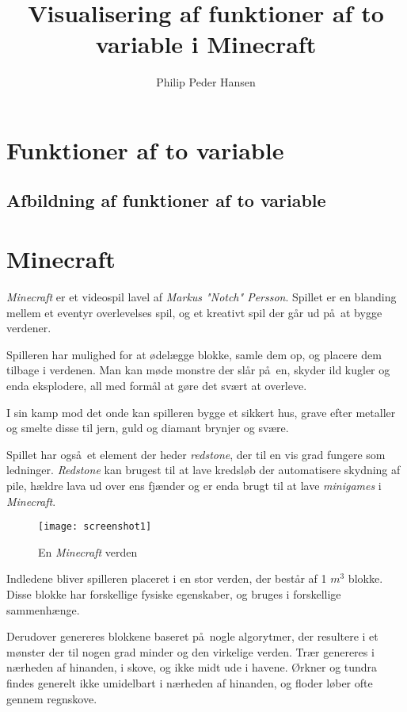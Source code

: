 \documentclass[a4paper,12pt]{report}
\author{Philip Peder Hansen}
\title{Visualisering af funktioner af to variable i Minecraft}
\begin{document}
	\maketitle
	\tableofcontents
	\clearpage
	\section{Funktioner af to variable}
	\subsection{Afbildning af funktioner af to variable}
	\section{Minecraft}
		\emph{Minecraft} er et videospil lavel af \emph{Markus "Notch" Persson}.
		Spillet er en blanding mellem et eventyr overlevelses spil, og et kreativt spil der g\aa r ud p\aa \ at bygge verdener.

		Spilleren har mulighed for at \o del\ae gge blokke, samle dem op, og placere dem tilbage i verdenen.
		Man kan m\o de monstre der sl\aa r p\aa \ en, skyder ild kugler og enda eksplodere, all med form\aa l
		at g\o re det sv\ae rt at overleve.

		I sin kamp mod det onde kan spilleren bygge et sikkert hus, grave efter metaller og smelte disse
		til jern, guld og diamant brynjer og sv\ae re.

		Spillet har ogs\aa \ et element der heder \emph{redstone}, der til en vis grad fungere som ledninger.
		\emph{Redstone} kan brugest til at lave kredsl\o b der automatisere skydning af pile, h\ae ldre lava
		ud over ens fj\ae nder og er enda brugt til at lave \emph{minigames} i \emph{Minecraft}.

		\begin{figure}
			\texttt{[image: screenshot1]}
			\caption{En \emph{Minecraft} verden}
		\end{figure}

		Indledene bliver spilleren placeret i en stor verden, der best\aa r af 1 \(m^3\) blokke. Disse blokke har forskellige fysiske egenskaber,
		og bruges i forskellige sammenh\ae nge.

		Derudover genereres blokkene baseret p\aa \ nogle algorytmer, der resultere i et m\o nster der til nogen grad minder
		og den virkelige verden. Tr\ae r genereres i n\ae rheden af hinanden, i skove, og ikke midt ude i havene.
		\O rkner og tundra findes generelt ikke umidelbart i n\ae rheden af hinanden, og floder l\o ber ofte gennem regnskove. 
\end{document}
